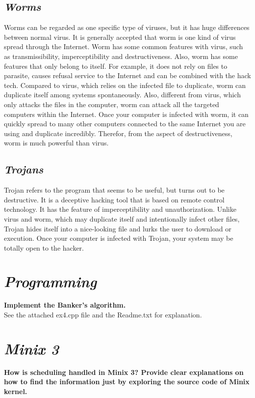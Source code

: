 \documentclass{article}
\begin{document}
\begin{spacing}{1.5}
\subsection{\textit{Worms}}
Worms can be regarded as one specific type of viruses, but it has huge differences between normal virus. It is generally accepted that worm is one kind of virus spread through the Internet. Worm has some common features with virus, such as transmissibility, imperceptibility and destructiveness. Also, worm has some features that only belong to itself. For example, it does not rely on files to parasite, causes refusal service to the Internet and can be combined with the hack tech. Compared to virus, which relies on the infected file to duplicate, worm can duplicate itself among systems spontaneously. Also, different from virus, which only attacks the files in the computer, worm can attack all the targeted computers within the Internet. Once your computer is infected with worm, it can quickly spread to many other computers connected to the same Internet you are using and duplicate incredibly. Therefor, from the aspect of destructiveness, worm is much powerful than virus.
\subsection{\textit{Trojans}}
Trojan refers to the program that seems to be useful, but turns out to be destructive. It is a deceptive hacking tool that is based on remote control technology. It has the feature of imperceptibility and unauthorization. Unlike virus and worm, which may duplicate itself and intentionally infect other files, Trojan hides itself into a nice-looking file and lurks the user to download or execution. Once your computer is infected with Trojan, your system may be totally open to the hacker.
\section{\textit{Programming}}
\textbf{Implement the Banker’s algorithm.}\\
See the attached ex4.cpp file and the Readme.txt for explanation.
\section{\textit{Minix 3}}
\textbf{How is scheduling handled in Minix 3? Provide clear explanations on how to find the information just by exploring the source code of Minix kernel.}\\


\end{spacing}
\end{document}
